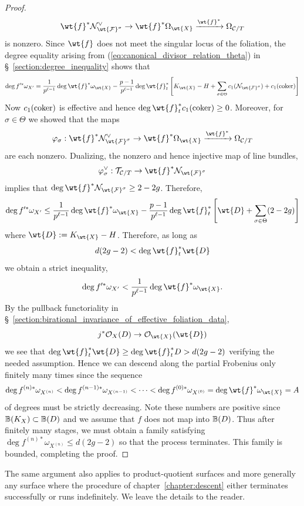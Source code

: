 \documentclass[main.tex]{subfiles}
\begin{document}
{\begin{proof}
\[ \wt{f}^* \cN^{\vee}_{\wt{\F}^{\sigma}} \to \wt{f}^* \Omega_{\wt{X}} \xrightarrow{\wt{f}^*}  \Omega_{\cC/T} \]
 is nonzero. Since $\wt{f}$ does not meet the singular locus of the foliation, the degree equality arising from (\ref{eq:canonical_divisor_relation_theta}) in \S~\ref{section:degree_inequality} shows that 
 \[ \deg{f'^* \omega_{X'}} = \frac{1}{p^{\ell-1}} \deg{\wt{f}^* \omega_{\wt{X}}} - \frac{p-1}{p^{\ell-1}} \deg{\wt{f}_t^* \left[ K_{\wt{X}} - H + \sum_{\sigma \in \Theta} c_1(\cN_{\wt{\F}^{\sigma}}) + c_1(\coker) \right]} \]
 Now $c_1(\operatorname{\mathrm{coker}})$ is effective and hence $\deg{\wt{f}_t^* c_1(\coker)} \ge 0$. Moreover, for $\sigma \in \Theta$ we showed that the maps
 \[ \varphi_{\sigma} : \wt{f}^* \cN^{\vee}_{\wt{\F}^{\sigma}} \to \wt{f}^* \Omega_{\wt{X}} \xrightarrow{\wt{f}^*}  \Omega_{\cC/T} \]
 are each nonzero. Dualizing, the nonzero and hence injective map of line bundles,
 \[ \varphi_{\sigma}^{\vee} : \cT_{\cC/T} \to \wt{f}^* \cN_{\wt{\F}^{\sigma}} \]
 implies that $\deg{\wt{f}^* \cN_{\wt{\F}^{\sigma}}} \ge 2 - 2g$. Therefore, 
 \[ \deg{f'^* \omega_{X'}} \le \frac{1}{p^{\ell-1}} \deg{\wt{f}^* \omega_{\wt{X}}} - \frac{p-1}{p^{\ell-1}} \deg{\wt{f}_t^* \left[ \wt{D} + \sum_{\sigma \in \Theta} (2 - 2g) \right]} \]
 where $\wt{D} := K_{\wt{X}} - H$. Therefore, as long as
 \[ d(2g - 2) < \deg{\wt{f}^*_t \wt{D}} \]
 we obtain a strict inequality, 
 \[ \deg{f'^* \omega_{X'}} < \frac{1}{p^{\ell-1}} \deg{\wt{f}^* \omega_{\wt{X}}}. \]
By the pullback functoriality in \S~\ref{section:birational_invariance_of_effective_foliation_data},
\[ j^* \cO_X(D) \to \cO_{\wt{X}}(\wt{D}) \]
we see that $\deg{\wt{f}^*_t \wt{D}} \ge \deg{\wt{f}^*_t D} > d(2g - 2)$ verifying the needed assumption.
Hence we can descend along the partial Frobenius only finitely many times since the sequence
\[ \deg{f^{(n)*} \omega_{X^{(n)}}} < \deg{f^{(n-1)*} \omega_{X^{(n-1)}}} < \cdots < \deg{f^{(0)*} \omega_{X^{(0)}}} = \deg{\wt{f}^* \omega_{\wt{X}}} = A \]
of degrees must be strictly decreasing. Note these numbers are positive since $\mathbb{B}(K_X) \subset \mathbb{B}(D)$ and we assume that $f$ does not map into $\mathbb{B}(D)$. Thus after finitely many stages, we must obtain a family satisfying $\deg{f^{(n)*} \omega_{X^{(n)}}} \le d(2g - 2)$ so that the process terminates. This family is bounded, completing the proof.
\end{proof}

The same argument also applies to product-quotient surfaces and more generally any surface where the procedure of chapter~\ref{chapter:descent} either terminates successfully or runs indefinitely. We leave the details to the reader.

}
\end{document}
